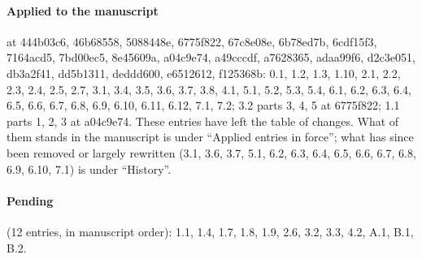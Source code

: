 \documentclass[10pt]{article}
\theoremstyle{definition}
\begin{document}
\paragraph*{Applied to the manuscript} at 444b03c6, 46b68558, 5088448e, 6775f822, 67c8e08e, 6b78ed7b, 6cdf15f3, 7164acd5, 7bd00ec5, 8e45609a, a04c9e74, a49cccdf, a7628365, adaa99f6, d2c3e051, db3a2f41, dd5b1311, deddd600, e6512612, f125368b: 0.1, 1.2, 1.3, 1.10, 2.1, 2.2, 2.3, 2.4, 2.5, 2.7, 3.1, 3.4, 3.5, 3.6, 3.7, 3.8, 4.1, 5.1, 5.2, 5.3, 5.4, 6.1, 6.2, 6.3, 6.4, 6.5, 6.6, 6.7, 6.8, 6.9, 6.10, 6.11, 6.12, 7.1, 7.2; 3.2 parts 3, 4, 5 at 6775f822; 1.1 parts 1, 2, 3 at a04c9e74.
These entries have left the table of changes. What of them stands in the manuscript is under
``Applied entries in force''; what has since been removed or largely rewritten (3.1, 3.6, 3.7, 5.1, 6.2, 6.3, 6.4, 6.5, 6.6, 6.7, 6.8, 6.9, 6.10, 7.1) is under ``History''.

\paragraph*{Pending} (12 entries, in manuscript order): 1.1, 1.4, 1.7, 1.8, 1.9, 2.6, 3.2, 3.3, 4.2, A.1, B.1, B.2.
\end{document}
